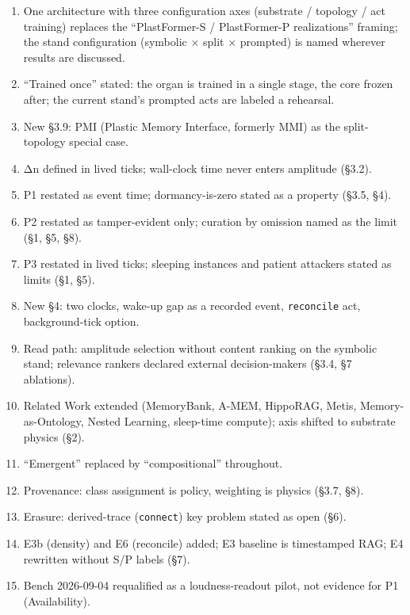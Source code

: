 \documentclass[
]{article}
\providecommand{\tightlist}{%
  \setlength{\itemsep}{0pt}\setlength{\parskip}{0pt}}
\begin{document}
\begin{enumerate}
\def\labelenumi{\arabic{enumi}.}
\tightlist
\item
  One architecture with three configuration axes (substrate / topology /
  act training) replaces the ``PlastFormer-S / PlastFormer-P
  realizations'' framing; the stand configuration (symbolic × split ×
  prompted) is named wherever results are discussed.
\item
  ``Trained once'' stated: the organ is trained in a single stage, the
  core frozen after; the current stand's prompted acts are labeled a
  rehearsal.
\item
  New §3.9: PMI (Plastic Memory Interface, formerly MMI) as the
  split-topology special case.
\item
  Δn defined in lived ticks; wall-clock time never enters amplitude
  (§3.2).
\item
  P1 restated as event time; dormancy-is-zero stated as a property
  (§3.5, §4).
\item
  P2 restated as tamper-evident only; curation by omission named as the
  limit (§1, §5, §8).
\item
  P3 restated in lived ticks; sleeping instances and patient attackers
  stated as limits (§1, §5).
\item
  New §4: two clocks, wake-up gap as a recorded event,
  \texttt{reconcile} act, background-tick option.
\item
  Read path: amplitude selection without content ranking on the symbolic
  stand; relevance rankers declared external decision-makers (§3.4, §7
  ablations).
\item
  Related Work extended (MemoryBank, A-MEM, HippoRAG, Metis,
  Memory-as-Ontology, Nested Learning, sleep-time compute); axis shifted
  to substrate physics (§2).
\item
  ``Emergent'' replaced by ``compositional'' throughout.
\item
  Provenance: class assignment is policy, weighting is physics (§3.7,
  §8).
\item
  Erasure: derived-trace (\texttt{connect}) key problem stated as open
  (§6).
\item
  E3b (density) and E6 (reconcile) added; E3 baseline is timestamped
  RAG; E4 rewritten without S/P labels (§7).
\item
  Bench 2026-09-04 requalified as a loudness-readout pilot, not evidence
  for P1 (Availability).
\end{enumerate}
\end{document}
